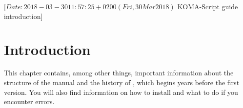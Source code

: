 %
%
%
%
%
%
%
%
% 
%
%
%
%

                 [$Date: 2018-03-30 11:57:25 +0200 (Fri, 30 Mar 2018) $
                  KOMA-Script guide introduction]


\chapter{Introduction}

This chapter contains, among other things, important information about the 
structure of the manual and the history of {\KOMAScript}, which begins 
years before the first version. You will also find information on how to
install {\KOMAScript} and what to do if you encounter errors.

